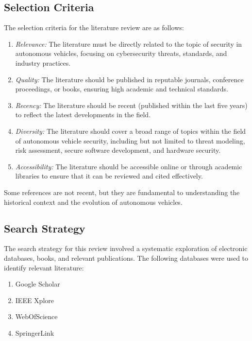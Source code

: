 \subsection{Selection Criteria}\label{subsec:selection-criteria}

The selection criteria for the literature review are as follows:
\begin{enumerate}
    \item \textit{Relevance:} The literature must be directly related to the topic of security in autonomous vehicles, focusing on cybersecurity threats, standards, and industry practices.
    \item \textit{Quality:} The literature should be published in reputable journals, conference proceedings, or books, ensuring high academic and technical standards.
    \item \textit{Recency:} The literature should be recent (published within the last five years) to reflect the latest developments in the field.
    \item \textit{Diversity:} The literature should cover a broad range of topics within the field of autonomous vehicle security, including but not limited to threat modeling, risk assessment, secure software development, and hardware security.
    \item \textit{Accessibility:} The literature should be accessible online or through academic libraries to ensure that it can be reviewed and cited effectively.
\end{enumerate}

Some references are not recent, but they are fundamental to understanding the historical context and the evolution of autonomous vehicles.

\subsection{Search Strategy}\label{subsec:search-strategy}

The search strategy for this review involved a systematic exploration of electronic databases, books, and relevant publications.
The following databases were used to identify relevant literature:

\begin{enumerate}
    \item Google Scholar
    \item IEEE Xplore
    \item WebOfScience
    \item SpringerLink
\end{enumerate}

